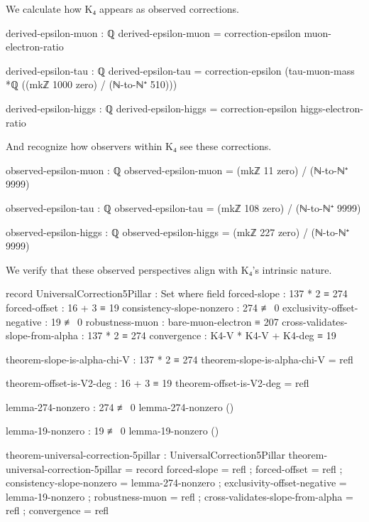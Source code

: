 \documentclass[11pt,a4paper]{book}
\begin{document}
We calculate how K₄ appears as observed corrections.

\begin{code}
derived-epsilon-muon : ℚ
derived-epsilon-muon = correction-epsilon muon-electron-ratio

derived-epsilon-tau : ℚ
derived-epsilon-tau = correction-epsilon (tau-muon-mass *ℚ ((mkℤ 1000 zero) / (ℕ-to-ℕ⁺ 510)))

derived-epsilon-higgs : ℚ
derived-epsilon-higgs = correction-epsilon higgs-electron-ratio
\end{code}

And recognize how observers within K₄ see these corrections.

\begin{code}
observed-epsilon-muon : ℚ
observed-epsilon-muon = (mkℤ 11 zero) / (ℕ-to-ℕ⁺ 9999)

observed-epsilon-tau : ℚ
observed-epsilon-tau = (mkℤ 108 zero) / (ℕ-to-ℕ⁺ 9999)

observed-epsilon-higgs : ℚ
observed-epsilon-higgs = (mkℤ 227 zero) / (ℕ-to-ℕ⁺ 9999)
\end{code}

We verify that these observed perspectives align with K₄'s intrinsic nature.

\begin{code}
record UniversalCorrection5Pillar : Set where
  field
    forced-slope  : 137 * 2 ≡ 274
    forced-offset : 16 + 3 ≡ 19
    consistency-slope-nonzero : 274 ≢ 0
    exclusivity-offset-negative : 19 ≢ 0
    robustness-muon       : bare-muon-electron ≡ 207
    cross-validates-slope-from-alpha : 137 * 2 ≡ 274
    convergence : K4-V * K4-V + K4-deg ≡ 19

theorem-slope-is-alpha-chi-V : 137 * 2 ≡ 274
theorem-slope-is-alpha-chi-V = refl

theorem-offset-is-V2-deg : 16 + 3 ≡ 19
theorem-offset-is-V2-deg = refl

lemma-274-nonzero : 274 ≢ 0
lemma-274-nonzero ()

lemma-19-nonzero : 19 ≢ 0
lemma-19-nonzero ()

theorem-universal-correction-5pillar : UniversalCorrection5Pillar
theorem-universal-correction-5pillar = record
  { forced-slope              = refl
  ; forced-offset             = refl
  ; consistency-slope-nonzero = lemma-274-nonzero
  ; exclusivity-offset-negative = lemma-19-nonzero
  ; robustness-muon           = refl
  ; cross-validates-slope-from-alpha = refl
  ; convergence               = refl
  }
\end{code}
\end{document}
